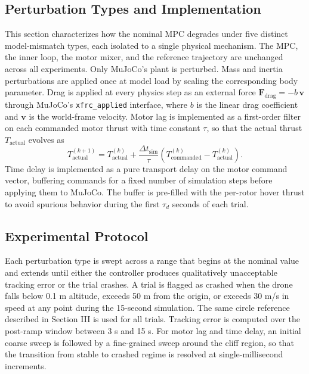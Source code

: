 \documentclass[conference]{IEEEtran}
\begin{document}
\subsection{Perturbation Types and Implementation}
This section characterizes how the nominal MPC degrades under five distinct model-mismatch types, each isolated to a single physical mechanism. The MPC, the inner loop, the motor mixer, and the reference trajectory are unchanged across all experiments. Only MuJoCo's plant is perturbed. Mass and inertia perturbations are applied once at model load by scaling the corresponding body parameter. Drag is applied at every physics step as an external force $\mathbf{F}_{\text{drag}} = -b\, \mathbf{v}$ through MuJoCo's \texttt{xfrc\_applied} interface, where $b$ is the linear drag coefficient and $\mathbf{v}$ is the world-frame velocity. Motor lag is implemented as a first-order filter on each commanded motor thrust with time constant $\tau$, so that the actual thrust $T_{\text{actual}}$ evolves as
\begin{equation}
T_{\text{actual}}^{(k+1)} = T_{\text{actual}}^{(k)} + \frac{\Delta t_{\text{sim}}}{\tau} \left( T_{\text{commanded}}^{(k)} - T_{\text{actual}}^{(k)} \right).
\end{equation}
Time delay is implemented as a pure transport delay on the motor command vector, buffering commands for a fixed number of simulation steps before applying them to MuJoCo. The buffer is pre-filled with the per-rotor hover thrust to avoid spurious behavior during the first $\tau_d$ seconds of each trial.

\subsection{Experimental Protocol}
Each perturbation type is swept across a range that begins at the nominal value and extends until either the controller produces qualitatively unacceptable tracking error or the trial crashes. A trial is flagged as crashed when the drone falls below 0.1 m altitude, exceeds 50 m from the origin, or exceeds 30 m/s in speed at any point during the 15-second simulation. The same circle reference described in Section III is used for all trials. Tracking error is computed over the post-ramp window between 3 s and 15 s. For motor lag and time delay, an initial coarse sweep is followed by a fine-grained sweep around the cliff region, so that the transition from stable to crashed regime is resolved at single-millisecond increments.
\end{document}
